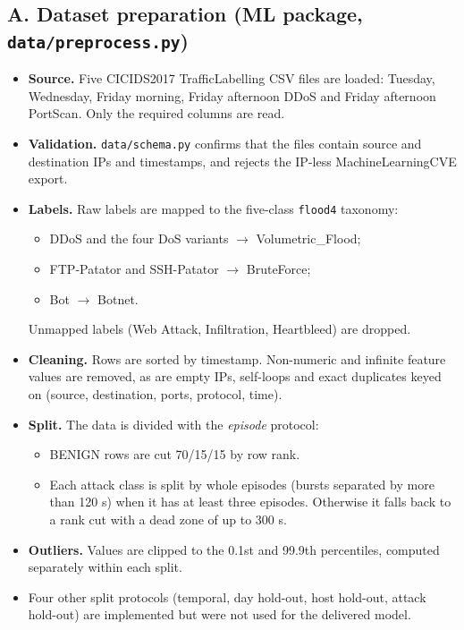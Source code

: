 \documentclass[12pt,a4paper]{report}
\begin{document}
\subsection*{A. Dataset preparation (ML package, \texttt{data/preprocess.py})}
\begin{itemize}
    \item \textbf{Source.} Five CICIDS2017 TrafficLabelling CSV files are loaded: Tuesday, Wednesday, Friday morning, Friday afternoon DDoS and Friday afternoon PortScan. Only the required columns are read.
    \item \textbf{Validation.} \texttt{data/schema.py} confirms that the files contain source and destination IPs and timestamps, and rejects the IP-less MachineLearningCVE export.
    \item \textbf{Labels.} Raw labels are mapped to the five-class \texttt{flood4} taxonomy:
    \begin{itemize}
        \item DDoS and the four DoS variants $\rightarrow$ Volumetric\_Flood;
        \item FTP-Patator and SSH-Patator $\rightarrow$ BruteForce;
        \item Bot $\rightarrow$ Botnet.
    \end{itemize}
    Unmapped labels (Web Attack, Infiltration, Heartbleed) are dropped.
    \item \textbf{Cleaning.} Rows are sorted by timestamp. Non-numeric and infinite feature values are removed, as are empty IPs, self-loops and exact duplicates keyed on (source, destination, ports, protocol, time).
    \item \textbf{Split.} The data is divided with the \emph{episode} protocol:
    \begin{itemize}
        \item BENIGN rows are cut 70/15/15 by row rank.
        \item Each attack class is split by whole episodes (bursts separated by more than 120 s) when it has at least three episodes. Otherwise it falls back to a rank cut with a dead zone of up to 300 s.
    \end{itemize}
    \item \textbf{Outliers.} Values are clipped to the 0.1st and 99.9th percentiles, computed separately within each split.
    \item Four other split protocols (temporal, day hold-out, host hold-out, attack hold-out) are implemented but were not used for the delivered model.
\end{itemize}
\end{document}
